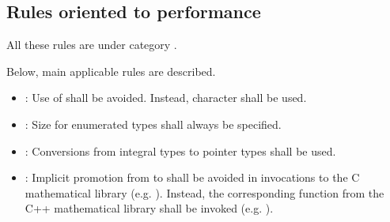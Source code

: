 \subsection{Rules oriented to performance}

All these rules are under category
.

Below, main applicable rules are described.

\begin{itemize}

\item {}:
Use of  shall be avoided.
Instead, character  shall be used.

\item {}:
Size for enumerated types shall always be specified.

\item {}:
Conversions from integral types to pointer types shall be used.

\item {}:
Implicit promotion from  to  shall be avoided
in invocations to the C mathematical library (e.g. ).
Instead, the corresponding function from the C++ mathematical library
shall be invoked (e.g. ).

\end{itemize}
